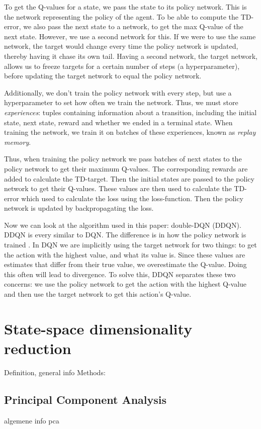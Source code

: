 To get the Q-values for a state, we pass the state to its policy network. This is the network representing the policy of the agent. To be able to compute the TD-error, we also pass the next state to a network, to get the max Q-value of the next state. However, we use a second network for this. If we were to use the same network, the target would change every time the policy network is updated, thereby having it chase its own tail. Having a second network, the target network, allows us to freeze targets for a certain number of steps (a hyperparameter), before updating the target network to equal the policy network.

Additionally, we don't train the policy network with every step, but use a hyperparameter to set how often we train the network. Thus, we must store \emph{experiences}: tuples containing information about a transition, including the initial state, next state, reward and whether we ended in a terminal state. When training the network, we train it on batches of these experiences, known as \emph{replay memory}. 

Thus, when training the policy network we pass batches of next states to the policy network to get their maximum Q-values. The corresponding rewards are added to calculate the TD-target. Then the initial states are passed to the policy network to get their Q-values. These values are then used to calculate the TD-error which used to calculate the loss using the loss-function. Then the policy network is updated by backpropagating the loss.

Now we can look at the algorithm used in this paper: double-DQN (DDQN). DDQN is every similar to DQN. The difference is in how the policy network is trained \cite{ddqn}. In DQN we are implicitly using the target network for two things: to get the action with the highest value, and what its value is. Since these values are estimates that differ from their true value, we overestimate the Q-value. Doing this often will lead to divergence. To solve this, DDQN separates these two concerns: we use the policy network to get the action with the highest Q-value and then use the target network to get this action's Q-value. 

\section{State-space dimensionality reduction}\label{pl-dimensionality}
Definition, general info
Methods:
\subsection{Principal Component Analysis}\label{pl-pca}
algemene info pca
